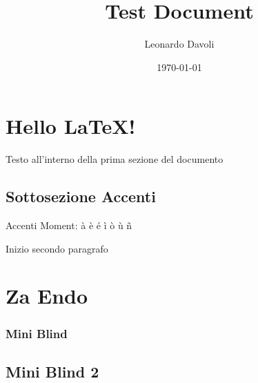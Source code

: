 \documentclass{book}
\author{Leonardo Davoli}
\title{Test Document}
\date{\today}
\begin{document}
\maketitle
\tableofcontents

\section{Hello \LaTeX!}
Testo all'interno della prima sezione del documento

\subsection{Sottosezione Accenti}
Accenti Moment: à è é ì ò ù \~n

Inizio secondo paragrafo
\section{Za Endo}

\Blindtext

\subsubsection{Mini Blind}
\Blindtext

\subsection{Mini Blind 2}
\blindtext

\blindtext
\end{document}
